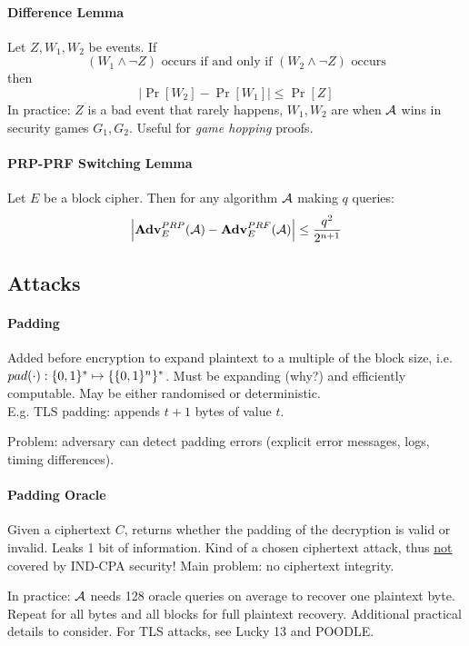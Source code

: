 \paragraph{Difference Lemma}
Let $Z, W_1, W_2$ be events. If
$$
(W_1 \wedge \neg Z) \text{ occurs if and only if } (W_2 \wedge \neg Z) \text{ occurs}
$$
then
$$
\Big| \Pr[W_2] - \Pr[W_1] \Big| \leq \Pr[Z]
$$
In practice: $Z$ is a bad event that rarely happens, $W_1, W_2$ are when $\mathcal{A}$ wins in security games $G_1, G_2$.
Useful for \emph{game hopping} proofs.

\paragraph{PRP-PRF Switching Lemma}
Let $E$ be a block cipher.
Then for any algorithm $\mathcal{A}$ making $q$ queries:
$$
\Big| \mathbf{Adv}^{PRP}_{E} (\mathcal{A}) - \mathbf{Adv}^{PRF}_{E} (\mathcal{A}) \Big| \leq \frac{q^2}{2^{n+1}}
$$



\subsection{Attacks}

\paragraph{Padding}
Added before encryption to expand plaintext to a multiple of the block size, i.e. \\$pad(\cdot): \lbrace 0, 1 \rbrace^* \mapsto \{ \lbrace 0, 1 \rbrace^n \}^*$.
Must be expanding (why?) and efficiently computable.
May be either randomised or deterministic.
\\
E.g. TLS padding: appends $t+1$ bytes of value $t$.

Problem: adversary can detect padding errors (explicit error messages, logs, timing differences).

\paragraph{Padding Oracle}
Given a ciphertext $C$, returns whether the padding of the decryption is valid or invalid.
Leaks 1 bit of information.
Kind of a chosen ciphertext attack, thus \underline{not} covered by IND-CPA security!
Main problem: no ciphertext integrity.

In practice:
$\mathcal{A}$ needs 128 oracle queries on average to recover one plaintext byte.
Repeat for all bytes and all blocks for full plaintext recovery.
Additional practical details to consider.
For TLS attacks, see Lucky 13 and POODLE.


